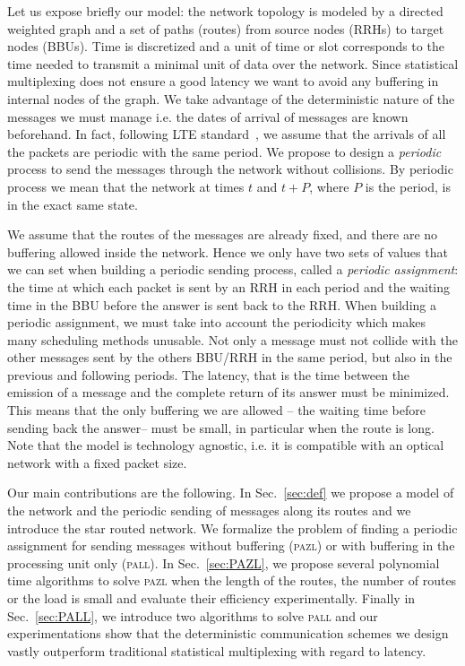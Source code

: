 \documentclass[a4paper,10pt]{IEEEtran}
\newcommand\pazl{\textsc{pazl}\xspace}
\newcommand\pall{\textsc{pall}\xspace}
\begin{document}
Let us expose briefly our model: the network topology is modeled by a directed weighted graph and a set of paths (routes) from source nodes (RRHs) to target nodes (BBUs). Time is discretized and a unit of time or slot corresponds to the time needed to transmit a minimal unit of data over the network. Since statistical multiplexing does not ensure a good latency we want to avoid any  buffering in internal nodes of the graph.  We take advantage of the deterministic nature of the messages we must manage i.e. the dates of arrival of messages are known beforehand. In fact, following LTE standard~\cite{bouguen2012lte}, we assume that the arrivals of all the packets are periodic with the same period. We propose to design a \emph{periodic} process to send the messages through the network without collisions. By periodic process we mean that the network at times $t$ and $t+P$, where $P$ is the period, is in the exact same state. 

We assume that the routes of the messages are already fixed, and there are no buffering allowed inside the network. Hence we only have two sets of values that we can set when building a periodic sending process, called a \emph{periodic assignment}: the time at which each packet is sent by an RRH in each period and the waiting time in the BBU before the answer is sent back to the RRH. When building a periodic assignment, we must take into account the periodicity which makes many scheduling methods unusable. Not only a message must not collide with the other messages sent by the others BBU/RRH in the same period, but also in the previous and following periods. The latency, that is the time between the emission of a message and the complete return of its answer must be minimized. This means that the only buffering we are allowed -- the waiting time before sending back the answer-- must be small, in particular when the route is long. Note that the model is technology agnostic, i.e. it is compatible with an optical network with a fixed packet size.   

Our main contributions are the following.
 In Sec.~\ref{sec:def} we propose a model of the network and the periodic sending of messages along its routes and we introduce the star routed network. We formalize the problem of finding a periodic assignment for sending messages without buffering (\pazl) or with buffering in the processing unit only (\pall). In Sec.~\ref{sec:PAZL}, we propose several polynomial time algorithms to solve \pazl when the length of the routes, the number of routes or the load is small and evaluate their efficiency experimentally. Finally in Sec.~\ref{sec:PALL}, we introduce two algorithms to solve \pall and our experimentations show that the deterministic communication schemes we design vastly outperform traditional statistical multiplexing with regard to latency. 
 
\end{document}
